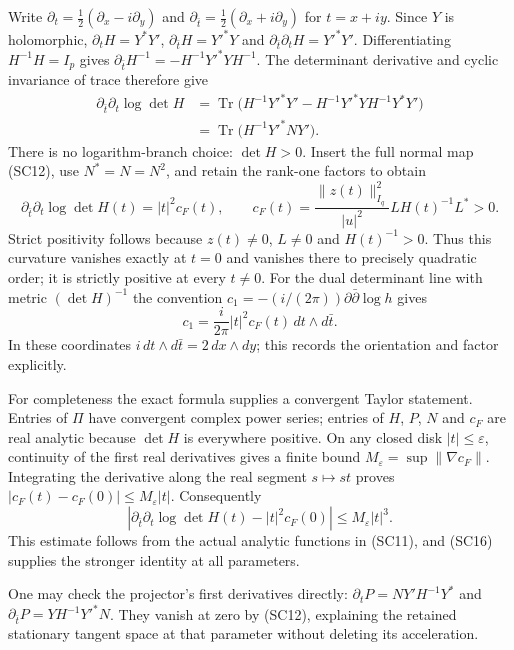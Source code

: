 Write $\partial_t=\tfrac12(\partial_x-i\partial_y)$ and
$\partial_{\bar t}=\tfrac12(\partial_x+i\partial_y)$ for $t=x+iy$.
Since $Y$ is holomorphic,
$\partial_tH=Y^*Y'$,
$\partial_{\bar t}H=Y'^*Y$ and
$\partial_{\bar t}\partial_tH=Y'^*Y'$.
Differentiating $H^{-1}H=I_p$ gives
$\partial_{\bar t}H^{-1}=-H^{-1}Y'^*YH^{-1}$.
The determinant derivative and cyclic invariance of trace therefore give
\[
\begin{split}
 \partial_{\bar t}\partial_t\log\det H
 &=\operatorname{Tr}\bigl(H^{-1}Y'^*Y'
   -H^{-1}Y'^*YH^{-1}Y^*Y'\bigr)\\
 &=\operatorname{Tr}\bigl(H^{-1}Y'^*N Y'\bigr).
\end{split}\tag{SC15}
\]
There is no logarithm-branch choice: $\det H>0$.
Insert the full normal map (SC12), use $N^*=N=N^2$, and retain
the rank-one factors to obtain
\[
 \boxed{\partial_{\bar t}\partial_t\log\det H(t)
   =|t|^2 c_F(t),\qquad
 c_F(t)=\frac{\|z(t)\|_{I_q}^2}{|u|^2}
                   L H(t)^{-1}L^*>0.}
 \tag{SC16}
\]
Strict positivity follows because $z(t)\ne0$, $L\ne0$ and
$H(t)^{-1}>0$.  Thus this curvature vanishes exactly at $t=0$
and vanishes there to precisely quadratic order; it is strictly
positive at every $t\ne0$.  For the dual determinant line with metric
$(\det H)^{-1}$ the convention
$c_1=-(i/(2\pi))\partial\bar\partial\log h$ gives
\[
 c_1=\frac i{2\pi}|t|^2c_F(t)\,dt\wedge d\bar t.
 \tag{SC17}
\]
In these coordinates $i\,dt\wedge d\bar t=2\,dx\wedge dy$;
this records the orientation and factor explicitly.

For completeness the exact formula supplies a convergent Taylor
statement.  Entries of $\Pi$ have convergent complex power series;
entries of $H$, $P$, $N$ and $c_F$ are real analytic because
$\det H$ is everywhere positive.  On any closed disk
$|t|\leq\varepsilon$, continuity of the first real derivatives gives
a finite bound $M_\varepsilon=\sup\|\nabla c_F\|$.
Integrating the derivative along the real segment $s\mapsto st$ proves
$|c_F(t)-c_F(0)|\leq M_\varepsilon|t|$.  Consequently
\[
 \left|\partial_{\bar t}\partial_t\log\det H(t)
                  -|t|^2c_F(0)\right|
 \leq M_\varepsilon|t|^3.
 \tag{SC18}
\]
This estimate follows from the actual analytic functions in (SC11),
and (SC16) supplies the stronger identity at all parameters.

One may check the projector's first derivatives directly:
$\partial_tP=NY'H^{-1}Y^*$ and
$\partial_{\bar t}P=YH^{-1}Y'^*N$.
They vanish at zero by (SC12), explaining the retained stationary
tangent space at that parameter without deleting its acceleration.

